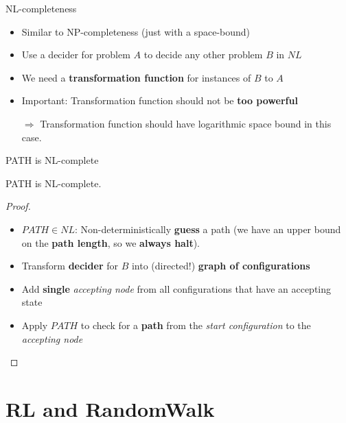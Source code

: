 \begin{frame}{NL-completeness}

\begin{itemize}
\item
  Similar to NP-completeness (just with a space-bound)
\item
  Use a decider for problem $A$ to decide any other problem $B$ in $NL$
\item
  We need a \textbf{transformation function} for instances of $B$ to $A$
\item
  Important: Transformation function should not be \textbf{too powerful}

  $\Rightarrow$ Transformation function should have logarithmic space
  bound in this case.
\end{itemize}

\end{frame}

\begin{frame}{PATH is NL-complete}

\begin{theorem}
    PATH is NL-complete.
\end{theorem}

\begin{proof}
\begin{itemize}
    \item $PATH \in NL$: Non-deterministically \textbf{guess} a path (we have an upper bound on the \textbf{path length}, so we \textbf{always halt}).
    \item Transform \textbf{decider} for $B$ into (directed!) \textbf{graph of configurations}
    \item Add \textbf{single} \textit{accepting node} from all configurations that have an accepting state
    \item Apply $PATH$ to check for a \textbf{path} from the \textit{start configuration} to the \textit{accepting node}
\end{itemize}
\end{proof}

\end{frame}

\section{RL and RandomWalk}\label{rl-and-randomwalk}

